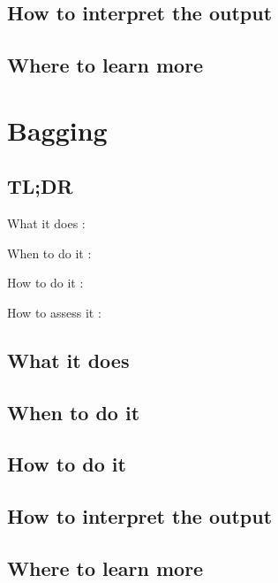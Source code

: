 \documentclass[
]{book}
\begin{document}
\hypertarget{how-to-interpret-the-output-15}{%
\section{How to interpret the output}\label{how-to-interpret-the-output-15}}

\hypertarget{where-to-learn-more-15}{%
\section{Where to learn more}\label{where-to-learn-more-15}}

\hypertarget{bagging}{%
\chapter{Bagging}\label{bagging}}

\hypertarget{tldr-16}{%
\section{TL;DR}\label{tldr-16}}

What it does
:

When to do it
:

How to do it
:

How to assess it
:

\hypertarget{what-it-does-16}{%
\section{What it does}\label{what-it-does-16}}

\hypertarget{when-to-do-it-16}{%
\section{When to do it}\label{when-to-do-it-16}}

\hypertarget{how-to-do-it-16}{%
\section{How to do it}\label{how-to-do-it-16}}

\hypertarget{how-to-interpret-the-output-16}{%
\section{How to interpret the output}\label{how-to-interpret-the-output-16}}

\hypertarget{where-to-learn-more-16}{%
\section{Where to learn more}\label{where-to-learn-more-16}}
\end{document}
